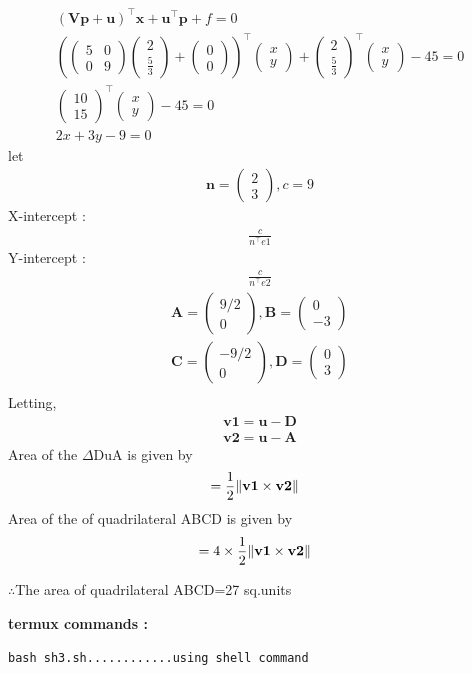 \documentclass[10pt, a4paper]{article}
\providecommand{\brak}[1]{\ensuremath{\left(#1\right)}}
\newcommand{\myvec}[1]{\ensuremath{\begin{pmatrix}#1\end{pmatrix}}}
\let\vec\mathbf
\begin{document}
\begin{align}
  \brak{\vec{V}\vec{p}+\vec{u}}^{\top}\vec{x}+\vec{u}^{\top}\vec{p}+f = 0 \\
 \brak{\myvec{5 & 0 \\
		 0 & 9}\myvec{2 \\
		              \frac{5}{3}}+\myvec{0\\0}}^{\top}
		               \myvec{x \\
		                      y}+\myvec{2 \\
		                             \frac{5}{3}}^{\top}\myvec{x \\
		                                                  y}-45=0\\
\myvec{10\\15}^{\top}\myvec{x \\
		                    y}-45=0\\
		                   2x+3y-9=0
\end{align}
let
		\begin{align}
	    \vec{n} = \myvec{2 \\ 3},c=9
	    	\end{align}
	    X-intercept :
	    \begin{align}
	    \frac{c}{n^{\top}e1}
	    \end{align}
	    Y-intercept : 
	    \begin{align}
	    \frac{c}{n^{\top}e2}
	    \end{align}
	    \begin{align}
	    \vec{A} = \myvec{9/2 \\ 0},  
	    \vec{B} = \myvec{ 0 \\ -3}\\
	    \vec{C} = \myvec{-9/2 \\ 0},    
	    \vec{D} = \myvec{ 0 \\ 3}\\
		\end{align}
Letting,
\begin{align}
\vec{v1}=\vec{u}-\vec{D}\\
\vec{v2}=\vec{u}-\vec{A}
\end{align}		
	Area of the $\Delta$DuA is given by 
	\begin{align}
&=\frac{1}{2}\norm{\vec{v1}\times\vec{v2}}
\end{align}
	Area of the of quadrilateral ABCD is given by 
	\begin{align}
&=4\times\frac{1}{2}\norm{\vec{v1}\times\vec{v2}}
\end{align}
\begin{center}
    $\therefore$The area of quadrilateral ABCD=27 sq.units\\
\end{center}
\textbf{termux commands :}
\begin{lstlisting}
bash sh3.sh............using shell command
\end{lstlisting}
\end{document}
